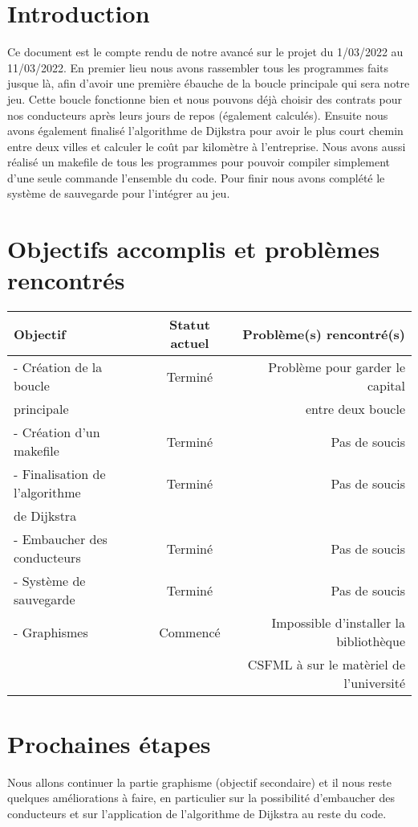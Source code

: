 \documentclass[a4paper, 12pt]{article}
\begin{document}
\newpage



\section*{Introduction}
      Ce document est le compte rendu de notre avancé sur le projet du 1/03/2022 au 11/03/2022. En premier lieu nous avons rassembler tous les programmes faits jusque là, afin d'avoir une première ébauche de la boucle principale qui sera notre jeu. Cette boucle fonctionne bien et nous pouvons déjà choisir des contrats pour nos conducteurs après leurs jours de repos (également calculés). Ensuite nous avons également finalisé l'algorithme de Dijkstra pour avoir le plus court chemin entre deux villes et calculer le coût par kilomètre à l'entreprise. Nous avons aussi réalisé un makefile de tous les programmes pour pouvoir compiler simplement d'une seule commande l'ensemble du code. Pour finir nous avons complété le système de sauvegarde pour l'intégrer au jeu.

\section{Objectifs accomplis et problèmes rencontrés}
     \begin{tabular}{|l|c|r|}
  \hline
  Objectif & Statut actuel & Problème(s) rencontré(s) \\
  \hline
   - Création de la boucle & Terminé & Problème pour garder le capital\\
   principale && entre deux boucle \\
   - Création d'un makefile & Terminé & Pas de soucis\\
   - Finalisation de l'algorithme & Terminé & Pas de soucis\\
   de Dijkstra &&\\
   - Embaucher des conducteurs & Terminé & Pas de soucis \\
   - Système de sauvegarde & Terminé & Pas de soucis\\
   - Graphismes & Commencé & Impossible d'installer la bibliothèque\\
   &&CSFML à sur le matèriel de l'université\\
  

  \hline
\end{tabular}
\section{Prochaines étapes}
    Nous allons continuer la partie graphisme (objectif secondaire) et il nous reste quelques améliorations à faire, en particulier sur la possibilité d'embaucher des conducteurs et sur l'application de l'algorithme de Dijkstra au reste du code.
    
\end{document}
